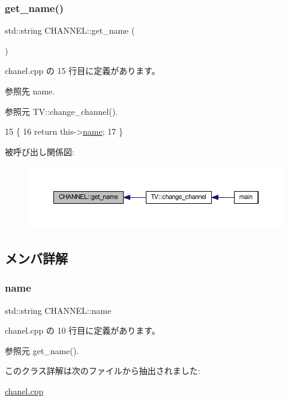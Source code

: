 \subsubsection{\texorpdfstring{get\+\_\+name()}{get\_name()}}
{\footnotesize\ttfamily std\+::string C\+H\+A\+N\+N\+E\+L\+::get\+\_\+name (\begin{DoxyParamCaption}{ }\end{DoxyParamCaption})\hspace{0.3cm}{\ttfamily [inline]}}



 chanel.\+cpp の 15 行目に定義があります。



参照先 name.



参照元 T\+V\+::change\+\_\+channel().


\begin{DoxyCode}
15                         \{
16         \textcolor{keywordflow}{return} this->\hyperlink{class_c_h_a_n_n_e_l_a1a513303b0e58b1c9e0e9e03f9f50617}{name};
17     \}
\end{DoxyCode}
被呼び出し関係図\+:\nopagebreak
\begin{figure}[H]
\begin{center}
\leavevmode
\includegraphics[width=350pt]{class_c_h_a_n_n_e_l_aa9daccb6ddb609e501245fed29f0adfd_icgraph}
\end{center}
\end{figure}


\subsection{メンバ詳解}
\mbox{\label{class_c_h_a_n_n_e_l_a1a513303b0e58b1c9e0e9e03f9f50617}} 
\subsubsection{\texorpdfstring{name}{name}}
{\footnotesize\ttfamily std\+::string C\+H\+A\+N\+N\+E\+L\+::name\hspace{0.3cm}{\ttfamily [private]}}



 chanel.\+cpp の 10 行目に定義があります。



参照元 get\+\_\+name().



このクラス詳解は次のファイルから抽出されました\+:\begin{DoxyCompactItemize}
\item 
\hyperlink{chanel_8cpp}{chanel.\+cpp}\end{DoxyCompactItemize}
